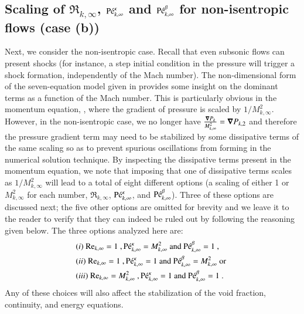 \documentclass[preprint,10pt]{elsarticle}
\begin{document}
\subsection{Scaling of $\Re_{k,\infty}$, $\textrm{P\'e}_{k,\infty}^\kappa$ and $\textrm{P\'e}_{k,\infty}^\beta$ for non-isentropic flows (case (b))}\label{eq:non_isent_flows}
Next, we consider the non-isentropic case. Recall that even subsonic flows can present shocks (for instance, 
a step initial condition in the pressure will trigger a shock formation, independently of the Mach number). 
The non-dimensional form of the seven-equation model given in  provides some insight on the 
dominant terms as a function of the Mach number. This is particularly obvious in the momentum equation, , 
where the gradient of pressure is scaled by $1/M_{k,\infty}^2$. However, in the non-isentropic case, we no longer 
have $\frac{\boldsymbol\nabla P_k}{M_{k,\infty}^2}=\boldsymbol\nabla P_{k,2}$ and therefore the pressure gradient term may need to be stabilized by 
some dissipative terms of the same scaling so as to prevent spurious oscillations from forming in the numerical solution technique. 
By inspecting the dissipative terms present in the momentum equation, we note that imposing that one of dissipative terms 
scales as $1/M_{k,\infty}^2$ will lead to a total of eight different options (a scaling of either 1 or $M^2_{k,\infty}$ for each number, 
$\Re_{k,\infty}$, $\textrm{P\'e}_{k,\infty}^\kappa$, and $\textrm{P\'e}_{k,\infty}^\beta$). Three of these options are discussed next; the five other 
options are omitted for brevity and we leave it to the reader to verify that they can indeed be ruled out by following the reasoning given below. The three options analyzed here are:
%
\begin{align}
&(i) \ \textrm{Re}_{k,\infty} = 1 \ , \textrm{P\'e}_{k,\infty}^\kappa = M_{k,\infty}^2 \text{ and } \textrm{P\'e}_{k,\infty}^\beta = 1 \ , \nonumber \\
&(ii) \ \textrm{Re}_{k,\infty} = 1 \ , \textrm{P\'e}_{k,\infty}^\kappa = 1 \text{ and } \textrm{P\'e}_{k,\infty}^\beta = M_{k,\infty}^2 \text{ or } \nonumber \\
&(iii) \ \textrm{Re}_{k,\infty} = M_{k,\infty}^2 \ , \textrm{P\'e}_{k,\infty}^\kappa = 1 \text{ and } \textrm{P\'e}_{k,\infty}^\beta = 1 \ . \nonumber
\end{align}
%
Any of these choices will also affect the stabilization of the void fraction, continuity, and energy equations. 
\end{document}
